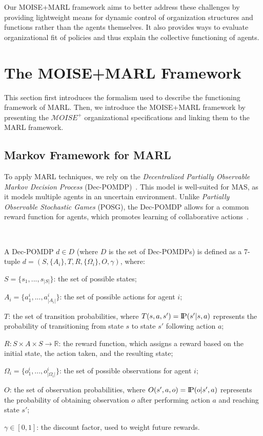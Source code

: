 \documentclass[sigconf,anonymous]{aamas}
\newcommand{\probP}{\text{I\kern-0.15em P}}
\begin{document}
Our MOISE+MARL framework aims to better address these challenges by providing lightweight means for dynamic control of organization structures and functions rather than the agents themselves. It also provides ways to evaluate organizational fit of policies and thus explain the collective functioning of agents.

\section{The MOISE+MARL Framework}
\label{sec:moise_marl_framework}

This section first introduces the formalism used to describe the functioning framework of MARL. Then, we introduce the MOISE+MARL framework by presenting the $\mathcal{M}OISE^+$ organizational specifications and linking them to the MARL framework.

\subsection{Markov Framework for MARL}

To apply MARL techniques, we rely on the \textit{Decentralized Partially Observable Markov Decision Process} (Dec-POMDP)~\citep{Oliehoek2016}. This model is well-suited for MAS, as it models multiple agents in an uncertain environment. Unlike \textit{Partially Observable Stochastic Games} (POSG), the Dec-POMDP allows for a common reward function for agents, which promotes learning of collaborative actions~\citep{Beynier2013}.

\

A Dec-POMDP $d \in D$ (where $D$ is the set of Dec-POMDPs) is defined as a 7-tuple $d = (S, \{A_i\}, T, R, \{\Omega_i\}, O, \gamma)$, where:
%
\begin{itemize*}[label={},itemjoin={; \quad}]
    \item $S = \{s_1,...,s_{|S|}\}$: the set of possible states;
    \item $A_{i} = \{a_{1}^{i},...,a_{|A_{i}|}^{i}\}$: the set of possible actions for agent $i$;
    \item $T$: the set of transition probabilities, where $T(s,a,s') = \probP(s'|s,a)$ represents the probability of transitioning from state $s$ to state $s'$ following action $a$;
    \item $R: S \times A \times S \rightarrow \mathbb{R}$: the reward function, which assigns a reward based on the initial state, the action taken, and the resulting state;
    \item $\Omega_{i} = \{o_{1}^{i},...,o_{|\Omega_{i}|}^{i}\}$: the set of possible observations for agent $i$;
    \item $O$: the set of observation probabilities, where $O(s',a,o) = \probP(o|s',a)$ represents the probability of obtaining observation $o$ after performing action $a$ and reaching state $s'$;
    \item $\gamma \in [0,1]$: the discount factor, used to weight future rewards.
\end{itemize*}
\end{document}
